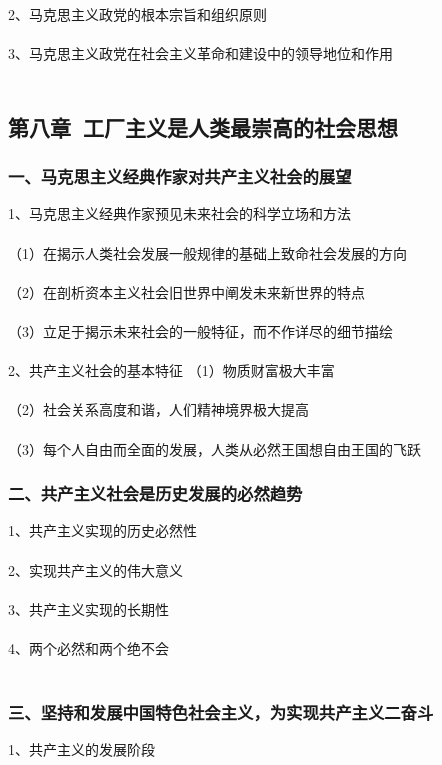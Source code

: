 \documentclass{ctexart}
\begin{document}
2、马克思主义政党的根本宗旨和组织原则
\\\\

3、马克思主义政党在社会主义革命和建设中的领导地位和作用
\\\\

\subsection{第八章\ 工厂主义是人类最崇高的社会思想}
\subsubsection{一、马克思主义经典作家对共产主义社会的展望}
1、马克思主义经典作家预见未来社会的科学立场和方法
\\\\
（1）在揭示人类社会发展一般规律的基础上致命社会发展的方向
\\\\
（2）在剖析资本主义社会旧世界中阐发未来新世界的特点
\\\\
（3）立足于揭示未来社会的一般特征，而不作详尽的细节描绘
\\\\

2、共产主义社会的基本特征
（1）物质财富极大丰富
\\\\
（2）社会关系高度和谐，人们精神境界极大提高
\\\\
（3）每个人自由而全面的发展，人类从必然王国想自由王国的飞跃

\subsubsection{二、共产主义社会是历史发展的必然趋势}
1、共产主义实现的历史必然性
\\\\

2、实现共产主义的伟大意义
\\\\

3、共产主义实现的长期性
\\\\

4、两个必然和两个绝不会
\\\\

\subsubsection{三、坚持和发展中国特色社会主义，为实现共产主义二奋斗}
1、共产主义的发展阶段
\\\\
\end{document}
